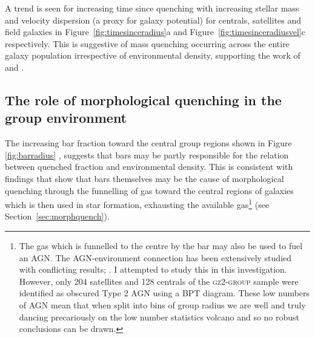 A trend is seen for increasing time since quenching with increasing stellar mass and velocity dispersion (a proxy for galaxy potential) for centrals, satellites and field galaxies in Figure~\ref{fig:timesinceradius}a and Figure~\ref{fig:timesinceradiusvel}c respectively. This is suggestive of mass quenching occurring across the entire galaxy population irrespective of environmental density, supporting the work of \citet{peng10, peng12, Gabor10} and \citet{darvish16}.

\subsection{The role of morphological quenching in the group environment}\label{sec:rolemorphenv}

The increasing bar fraction toward the central group regions  shown in Figure \ref{fig:barradius} \citep[in agreement with][]{skibba12}, suggests that bars may be partly responsible for the relation between quenched fraction and environmental density. This is consistent with findings that show that bars themselves may be the cause of morphological quenching through the funnelling of gas toward the central regions of galaxies \citep{athanassoula92b, sheth05} which is then used in star formation, exhausting the available gas\footnote{The gas which is funnelled to the centre by the bar may also be used to fuel an AGN. The AGN-environment connection has been extensively studied with conflicting results; \cite[e.g. see][]{miller03, pimbblet12, pimbblet13, elhert14, desouza16}. I attempted to study this in this investigation. However, only 204 satellites and 128 centrals of the \textsc{gz2-group} sample were identified as obscured Type 2 AGN using a BPT diagram. These low numbers of AGN mean that when split into bins of group radius we are well and truly dancing precariously on the low number statistics volcano and so no robust conclusions can be drawn.} (see Section~\ref{sec:morphquench}).


